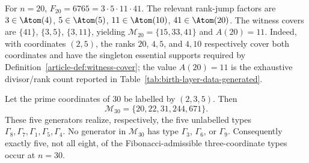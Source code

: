 \begin{example}\label{ex:n20}
For $n=20$, $F_{20}=6765=3\cdot 5\cdot 11\cdot 41$. The relevant rank-jump
factors are $3\in\Atom(4)$, $5\in\Atom(5)$, $11\in\Atom(10)$,
$41\in\Atom(20)$. The witness covers are $\{41\}$, $\{3,5\}$, $\{3,11\}$,
yielding $\mathcal M_{20}=\{15,33,41\}$ and $A(20)=11$.
Indeed, with coordinates $(2,5)$, the ranks $20$, $4,5$, and $4,10$
respectively cover both coordinates and have the singleton essential supports
required by Definition~\ref{article-def:witness-cover}; the value $A(20)=11$ is the
exhaustive divisor/rank count reported in Table~\ref{tab:birth-layer-data-generated}.
\end{example}

\begin{proposition}[Exact support-three realization at $n=30$]
\label{prop:n30-five-type-classification}
Let the prime coordinates of $30$ be labelled by $(2,3,5)$. Then
\[
 \mathcal M_{30}=\{20,22,31,244,671\}.
\]
These five generators realize, respectively, the five unlabelled types
$\Gamma_8,\Gamma_7,\Gamma_1,\Gamma_5,\Gamma_4$.  No generator in
$\mathcal M_{30}$ has type $\Gamma_3$, $\Gamma_6$, or $\Gamma_9$.
Consequently exactly five, not all eight, of the Fibonacci-admissible
three-coordinate types occur at $n=30$.
\end{proposition}

